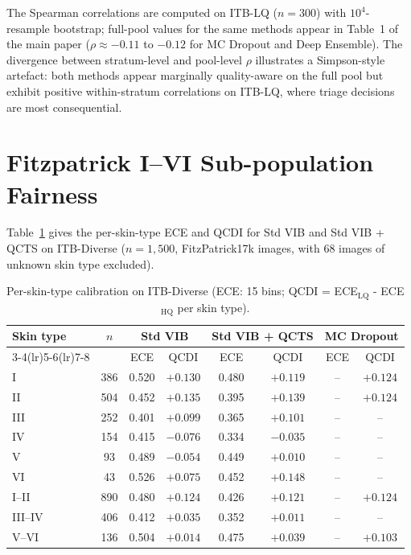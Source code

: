 \documentclass{bmvc2k}
\begin{document}
The Spearman correlations are computed on ITB-LQ ($n{=}300$) with $10^4$-resample bootstrap; full-pool values for the same methods appear in Table~1 of the main paper ($\rho\approx-0.11$ to $-0.12$ for MC Dropout and Deep Ensemble). The divergence between stratum-level and pool-level $\rho$ illustrates a Simpson-style artefact: both methods appear marginally quality-aware on the full pool but exhibit positive within-stratum correlations on ITB-LQ, where triage decisions are most consequential.

\section{Fitzpatrick I--VI Sub-population Fairness}
\label{app:fairness}

Table~\ref{tab:fairness_full} gives the per-skin-type ECE and QCDI for Std VIB and Std VIB + QCTS on ITB-Diverse ($n{=}1{,}500$, FitzPatrick17k images, with 68 images of unknown skin type excluded).

\begin{table}[h]
\centering
\caption{Per-skin-type calibration on ITB-Diverse (ECE: 15 bins; QCDI = ECE$_\text{LQ}$ - ECE$_\text{HQ}$ per skin type).}
\label{tab:fairness_full}
\footnotesize
\begin{tabular}{lccccccc}
\toprule
Skin type & $n$ & \multicolumn{2}{c}{Std VIB} & \multicolumn{2}{c}{Std VIB + QCTS} & \multicolumn{2}{c}{MC Dropout} \\
\cmidrule(lr){3-4}\cmidrule(lr){5-6}\cmidrule(lr){7-8}
& & ECE & QCDI & ECE & QCDI & ECE & QCDI \\
\midrule
I   & 386 & 0.520 & $+0.130$ & 0.480 & $+0.119$ & -- & $+0.124$ \\
II  & 504 & 0.452 & $+0.135$ & 0.395 & $+0.139$ & -- & $+0.124$ \\
III & 252 & 0.401 & $+0.099$ & 0.365 & $+0.101$ & -- & -- \\
IV  & 154 & 0.415 & $-0.076$ & 0.334 & $-0.035$ & -- & -- \\
V   &  93 & 0.489 & $-0.054$ & 0.449 & $+0.010$ & -- & -- \\
VI  &  43 & 0.526 & $+0.075$ & 0.452 & $+0.148$ & -- & -- \\
\midrule
I--II  & 890 & 0.480 & $+0.124$ & 0.426 & $+0.121$ & -- & $+0.124$ \\
III--IV& 406 & 0.412 & $+0.035$ & 0.352 & $+0.011$ & -- & -- \\
V--VI  & 136 & 0.504 & $+0.014$ & 0.475 & $+0.039$ & -- & $+0.103$ \\
\bottomrule
\end{tabular}
\end{table}
\end{document}
